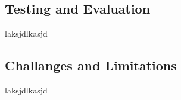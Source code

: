 \subsection{Testing and Evaluation}
laksjdlkasjd

\subsection{Challanges and Limitations}
laksjdlkasjd
